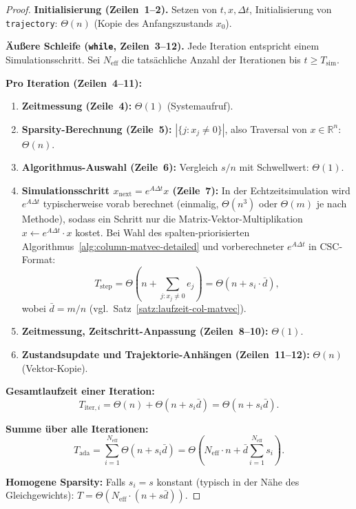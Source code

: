 \documentclass[a4paper,12pt]{report}
\theoremstyle{definition}
\begin{document}
	\begin{proof}
		\textbf{Initialisierung (Zeilen~1--2).} Setzen von $t, x, \Delta t$, Initialisierung von \texttt{trajectory}: $\Theta(n)$ (Kopie des Anfangszustands $x_0$).

		\textbf{Äußere Schleife (\texttt{while}, Zeilen~3--12).} Jede Iteration entspricht einem Simulationsschritt. Sei $N_{\mathrm{eff}}$ die tatsächliche Anzahl der Iterationen bis $t \geq T_{\mathrm{sim}}$.

		\textbf{Pro Iteration (Zeilen~4--11):}
		\begin{enumerate}
			\item \textbf{Zeitmessung (Zeile~4):} $\Theta(1)$ (Systemaufruf).
			\item \textbf{Sparsity-Berechnung (Zeile~5):} $|\{j : x_j \neq 0\}|$, also Traversal von $x \in \mathbb{R}^n$: $\Theta(n)$.
			\item \textbf{Algorithmus-Auswahl (Zeile~6):} Vergleich $s/n$ mit Schwellwert: $\Theta(1)$.
			\item \textbf{Simulationsschritt $x_{\mathrm{next}} = e^{A\Delta t} x$ (Zeile~7):}
			In der Echtzeitsimulation wird $e^{A\Delta t}$ typischerweise vorab berechnet (einmalig, $\Theta(n^3)$ oder $\Theta(m)$ je nach Methode), sodass ein Schritt nur die Matrix-Vektor-Multiplikation $x \gets e^{A\Delta t} \cdot x$ kostet. Bei Wahl des spalten-priorisierten Algorithmus~\ref{alg:column-matvec-detailed} und vorberechneter $e^{A\Delta t}$ in CSC-Format:
			\[
				T_{\mathrm{step}} = \Theta\!\left(n + \sum_{j: x_j \neq 0} e_j\right) = \Theta(n + s_i \cdot \bar{d}),
			\]
			wobei $\bar{d} = m/n$ (vgl.\ Satz~\ref{satz:laufzeit-col-matvec}).
			\item \textbf{Zeitmessung, Zeitschritt-Anpassung (Zeilen~8--10):} $\Theta(1)$.
			\item \textbf{Zustandsupdate und Trajektorie-Anhängen (Zeilen~11--12):} $\Theta(n)$ (Vektor-Kopie).
		\end{enumerate}

		\textbf{Gesamtlaufzeit einer Iteration:}
		\[
			T_{\mathrm{iter},i} = \Theta(n) + \Theta(n + s_i \bar{d}) = \Theta(n + s_i \bar{d}).
		\]

		\textbf{Summe über alle Iterationen:}
		\[
			T_{\mathrm{ada}} = \sum_{i=1}^{N_{\mathrm{eff}}} \Theta(n + s_i \bar{d})
			= \Theta\!\left(N_{\mathrm{eff}} \cdot n + \bar{d} \sum_{i=1}^{N_{\mathrm{eff}}} s_i\right).
		\]

		\textbf{Homogene Sparsity:} Falls $s_i = s$ konstant (typisch in der Nähe des Gleichgewichts): $T = \Theta(N_{\mathrm{eff}} \cdot (n + s \bar{d}))$.


\end{proof}
\end{document}
